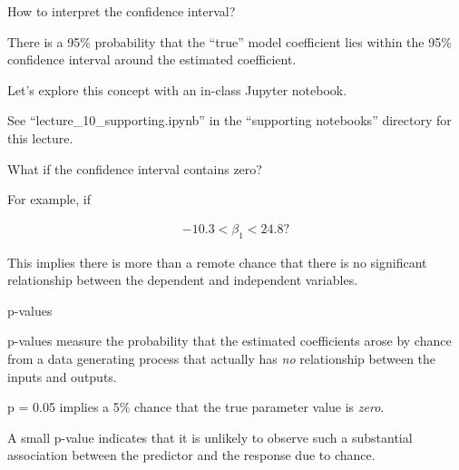 \documentclass[aspectratio=169]{beamer}
\begin{document}
\begin{frame}{How to interpret the confidence interval?}

\pause

There is a 95\% probability that the ``true'' model coefficient lies within the 95\% confidence interval around the estimated coefficient.  

\vspace{5mm}

Let's explore this concept with an in-class Jupyter notebook.

\vspace{5mm}

  See ``lecture\_10\_supporting.ipynb'' in the ``supporting notebooks'' directory for this lecture.


\end{frame}

\begin{frame}{What if the confidence interval contains zero?}

For example, if 

\begin{align*}
-10.3 < \beta_1 < 24.8?
\end{align*}

This implies there is more than a remote chance that there is no significant relationship between the dependent and independent variables.  

\end{frame}

\begin{frame}{p-values}


p-values measure the probability that the estimated coefficients arose by chance from a data generating process that actually has \textit{no} relationship between the inputs and outputs.  

\vspace{5mm}

p = 0.05 implies a 5\% chance that the true parameter value is \textit{zero}.  

\vspace{5mm}

A small p-value indicates that it is unlikely to observe such a substantial association between the predictor and the response due to chance.

\end{frame}
\end{document}
